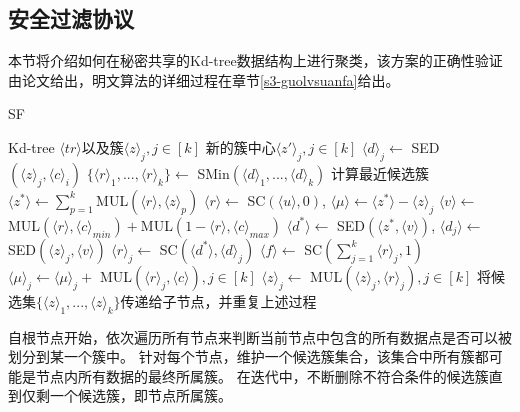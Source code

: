 \subsection{安全过滤协议}
本节将介绍如何在秘密共享的Kd-tree数据结构上进行聚类，该方案的正确性验证由论文\cite{kanungo2002efficient}给出，明文算法的详细过程在章节\ref{s3-guolvsuanfa}给出。
\begin{algorithm}[htbp]
	\renewcommand{\algorithmicrequire}{\textbf{输入:}}
	\renewcommand{\algorithmicensure}{\textbf{输出:}}
	\caption{SF}
	\label{alg_sf}
	\begin{algorithmic}[1]
		\REQUIRE Kd-tree $\langle tr \rangle$以及簇$\langle z \rangle_j, j\in[k]$
		\ENSURE 新的簇中心$\langle z'\rangle_j,j\in[k]$
		\STATE $\langle d \rangle_j \leftarrow$ SED$(\langle z \rangle_j, \langle c \rangle_i)$ %
		\ENDFOR
		\STATE $\{\langle r\rangle_1,...,\langle r\rangle_k\} \leftarrow$ SMin$(\langle d \rangle_1,...,\langle d \rangle_k)$
		\STATE 计算最近候选簇$\langle z^* \rangle \leftarrow \sum_{p=1}^k$MUL$(\langle r \rangle,\langle z\rangle_p)$ %
		\STATE $\langle r \rangle \leftarrow$ SC$(\langle u \rangle, 0)$, $\langle \mu \rangle \leftarrow \langle z^{*} \rangle - \langle z\rangle_j$%
		\STATE $\langle v \rangle \leftarrow$ MUL$(\langle r\rangle, \langle c \rangle_{min})+ $MUL$(1-\langle r\rangle,\langle c\rangle_{max})$
		\STATE $\langle d^{*}\rangle \leftarrow$ SED$(\langle z^{*}, \langle v \rangle)$, $\langle d_j \rangle \leftarrow$ SED$(\langle z\rangle_j,\langle v\rangle)$ %
		\STATE $\langle r\rangle_j \leftarrow$ SC$(\langle d^{*}\rangle, \langle d\rangle_j)$
		\ENDFOR
		\STATE $\langle f \rangle \leftarrow$ SC$(\sum_{j=1}^{k}\langle r\rangle_j, 1)$
		\STATE $\langle \mu \rangle_j \leftarrow \langle \mu \rangle_j +$ MUL$(\langle r\rangle_j, \langle c \rangle),j\in[k]$ %
		\ELSE
		\STATE $\langle z \rangle_j \leftarrow$ MUL$(\langle z \rangle_j, \langle r\rangle_j), j\in[k]$
		\STATE 将候选集$\{\langle z \rangle_1,...,\langle z\rangle_k\}$传递给子节点，并重复上述过程
		\ENDIF
		\ENDFOR
	\end{algorithmic}
\end{algorithm}

自根节点开始，依次遍历所有节点来判断当前节点中包含的所有数据点是否可以被划分到某一个簇中。
针对每个节点，维护一个候选簇集合，该集合中所有簇都可能是节点内所有数据的最终所属簇。
在迭代中，不断删除不符合条件的候选簇直到仅剩一个候选簇，即节点所属簇。

